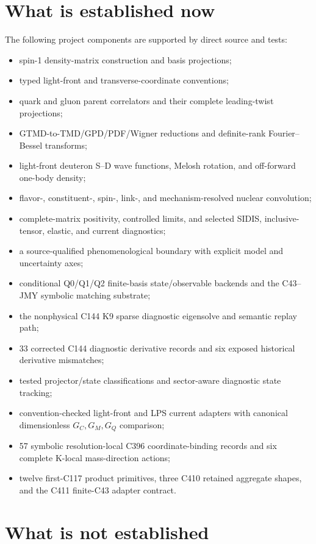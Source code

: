 \documentclass[11pt,oneside]{book}
\begin{document}
\section{What is established now}

The following project components are supported by direct source and tests:
\begin{itemize}
 \item spin-1 density-matrix construction and basis projections;
 \item typed light-front and transverse-coordinate conventions;
 \item quark and gluon parent correlators and their complete leading-twist projections;
 \item GTMD-to-TMD/GPD/PDF/Wigner reductions and definite-rank Fourier--Bessel transforms;
 \item light-front deuteron S--D wave functions, Melosh rotation, and off-forward one-body density;
 \item flavor-, constituent-, spin-, link-, and mechanism-resolved nuclear convolution;
 \item complete-matrix positivity, controlled limits, and selected SIDIS, inclusive-tensor, elastic, and current diagnostics;
 \item a source-qualified phenomenological boundary with explicit model and uncertainty axes;
 \item conditional Q0/Q1/Q2 finite-basis state/observable backends and the C43--JMY symbolic matching substrate;
 \item the nonphysical C144 K9 sparse diagnostic eigensolve and semantic replay path;
 \item 33 corrected C144 diagnostic derivative records and six exposed historical derivative mismatches;
 \item tested projector/state classifications and sector-aware diagnostic state tracking;
 \item convention-checked light-front and LPS current adapters with canonical dimensionless $G_C,G_M,G_Q$ comparison;
 \item 57 symbolic resolution-local C396 coordinate-binding records and six complete K-local mass-direction actions;
 \item twelve first-C117 product primitives, three C410 retained aggregate shapes, and the C411 finite-C43 adapter contract.
\end{itemize}

\section{What is not established}
\end{document}
